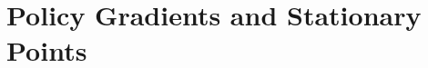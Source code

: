 \documentclass{article}
\DeclareMathOperator*{\1}{\mathbbm{1}}
\newcounter{DocPoints} %
\newcounter{QuestionPoints} %
\newcommand{\tpoints}[1]{        %
	\ifthenelse{\isempty{#1}}%
	{%
	}%
	{%
		\addtocounter{DocPoints}{#1}
		\addtocounter{QuestionPoints}{#1}
	}													 %
	\par\mbox{}\par\noindent\hfill {Total: \bf \arabic{QuestionPoints}\xspace points}\par\mbox{}\par\hrule\hrule
	\setcounter{QuestionPoints}{0}
}
\theoremstyle{definition}
\newtheorem{question}{Question}
\theoremstyle{remark}
\newtheorem*{solution*}{Solution}
\begin{document}
%
%
%
%
%
%
%
%
%
%
%



\section*{Policy Gradients and Stationary Points }
\end{document}
